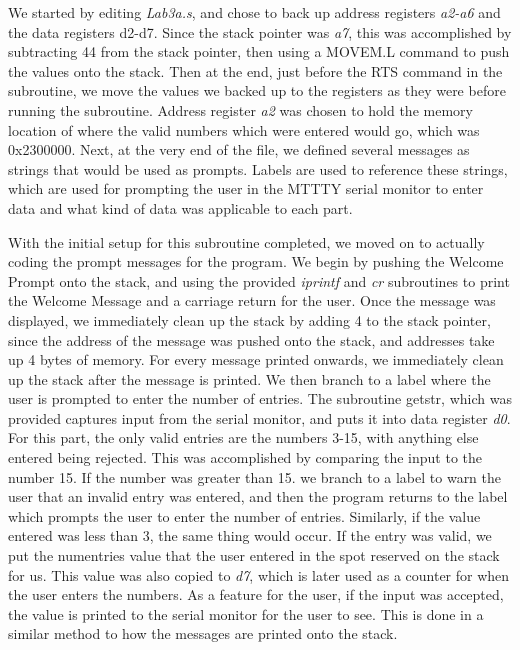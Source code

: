 \documentclass[letterpaper]{article}
\begin{document}
    We started by editing \textit{Lab3a.s}, and chose to back up
    address registers \textit{a2-a6} and the data registers d2-d7. Since the stack pointer
    was \textit{a7}, this was accomplished by subtracting 44 from the stack pointer,
    then using a MOVEM.L command to push the values onto the stack. Then at the end, just before
    the RTS command in the subroutine, we move the values we backed up to the registers
    as they were before running the subroutine. Address register \textit{a2} was chosen to
    hold the memory location of where the valid numbers which were entered would go, which
    was 0x2300000.
    Next, at the very end of the file, we
    defined several messages as strings that would be used as prompts. Labels are used to reference
    these strings, which are used for prompting the user in the MTTTY serial monitor to enter data and what kind of data was applicable to each part.

    With the initial setup for this subroutine completed, we moved on to
    actually coding the prompt messages for the program. We begin by
    pushing the Welcome Prompt onto the stack, and using the provided \textit{iprintf}
    and \textit{cr} subroutines to print the Welcome Message and a carriage return for the
    user. Once the message was displayed, we immediately clean up the stack by adding 4
    to the stack pointer, since the address of the message was pushed onto the stack,
    and addresses take up 4 bytes of memory. For every message printed onwards,
    we immediately clean up the stack after the message is printed. We then branch to a label where the user
    is prompted to enter the number of entries. The subroutine getstr, which was provided captures input from the serial monitor,
    and puts it into data register \textit{d0}. For this part, the only
    valid entries are the numbers 3-15, with anything else entered being rejected.
    This was accomplished by comparing the input to the number 15. If the number was
    greater than 15. we branch to a label to warn the user that an invalid entry was entered,
    and then the program returns to the label which prompts the user to enter
    the number of entries. Similarly, if the value entered was less than 3, the same thing would occur.
    If the entry was valid, we put the numentries value that the user entered in the spot reserved on the
    stack for us. This value was also copied to \textit{d7}, which is later used as a counter
    for when the user enters the numbers. As a feature for the user, if the input was
    accepted, the value is printed to the serial monitor for the user to see. This is done
    in a similar method to how the messages are printed onto the stack.
\end{document}
